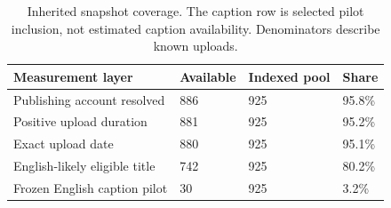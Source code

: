 \begin{table}[htbp]
\small\centering
\setlength{\tabcolsep}{4pt}
\begin{tabular}{p{}p{}p{}p{}}
\toprule
Measurement layer & Available & Indexed pool & Share \\ \midrule
Publishing account resolved & 886 & 925 & 95.8\% \\
Positive upload duration & 881 & 925 & 95.2\% \\
Exact upload date & 880 & 925 & 95.1\% \\
English-likely eligible title & 742 & 925 & 80.2\% \\
Frozen English caption pilot & 30 & 925 & 3.2\% \\
\bottomrule
\end{tabular}
\caption{Inherited snapshot coverage. The caption row is selected pilot inclusion, not estimated caption availability. Denominators describe known uploads.}
\end{table}
